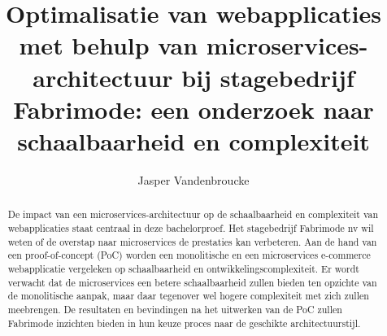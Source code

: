 \documentclass{hogent-article}
\title{Optimalisatie van webapplicaties met behulp van microservices-architectuur bij stagebedrijf Fabrimode: een onderzoek naar schaalbaarheid en complexiteit}
\author{Jasper Vandenbroucke}
\begin{document}
\begin{abstract}
  De impact van een microservices-architectuur op de schaalbaarheid en complexiteit van webapplicaties staat centraal in deze bachelorproef. Het stagebedrijf Fabrimode nv wil weten of de overstap naar microservices de prestaties kan verbeteren. Aan de hand van een proof-of-concept (PoC) worden een monolitische en een microservices e-commerce webapplicatie vergeleken op schaalbaarheid en ontwikkelingscomplexiteit. Er wordt verwacht dat de microservices een betere schaalbaarheid zullen bieden ten opzichte van de monolitische aanpak, maar daar tegenover wel hogere complexiteit met zich zullen meebrengen. De resultaten en bevindingen na het uitwerken van de PoC zullen Fabrimode inzichten bieden in hun keuze proces naar de geschikte architectuurstijl.
\end{abstract}

\tableofcontents



\printbibliography[heading=bibintoc]
\end{document}
